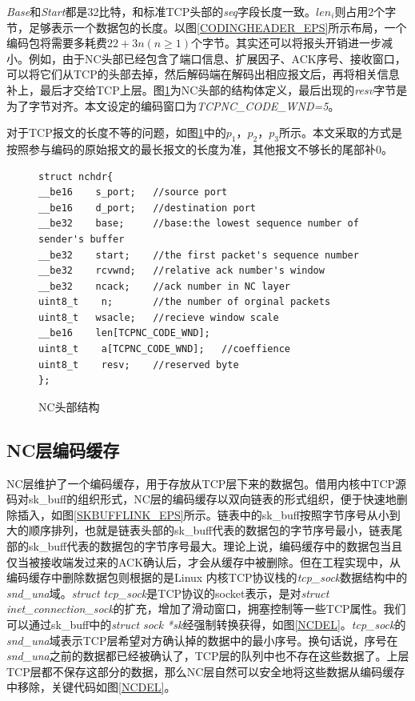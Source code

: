 \par
\emph{Base}和\emph{Start}都是32比特，和标准TCP头部的\emph{seq}字段长度一致。$len_{i}$则占用2个字节，足够表示一个数据包的长度。以图\ref{CODINGHEADER_EPS}所示布局，一个编码包将需要多耗费$22+3n\left(n \ge 1\right)$个字节。其实还可以将报头开销进一步减小。例如，由于NC头部已经包含了端口信息、扩展因子、ACK序号、接收窗口，可以将它们从TCP的头部去掉，然后解码端在解码出相应报文后，再将相关信息补上，最后才交给TCP上层。图\ref{NCHEAD}为NC头部的结构体定义，最后出现的\emph{resv}字节是为了字节对齐。本文设定的编码窗口为\emph{TCPNC\_CODE\_WND=5}。
\par
对于TCP报文的长度不等的问题，如图\ref{NCHEAD}中的$p_{1}$，$p_{2}$，$p_{3}$所示。本文采取的方式是按照参与编码的原始报文的最长报文的长度为准，其他报文不够长的尾部补0。
\begin{figure}
	\begin{lstlisting}[language={[ANSI]C}]
struct nchdr{
__be16    s_port;	//source port
__be16    d_port;	//destination port
__be32    base;		//base:the lowest sequence number of sender's buffer
__be32    start;	//the first packet's sequence number
__be32    rcvwnd;   //relative ack number's window
__be32    ncack;	//ack number in NC layer
uint8_t    n;		//the number of orginal packets
uint8_t   wsacle;	//recieve window scale
__be16    len[TCPNC_CODE_WND];
uint8_t    a[TCPNC_CODE_WND];	//coeffience
uint8_t    resv;	//reserved byte
};
	\end{lstlisting}
	\caption{NC头部结构}
	\label{NCHEAD}
\end{figure}
\subsection{NC层编码缓存}
NC层维护了一个编码缓存，用于存放从TCP层下来的数据包。借用内核中TCP源码对sk\_buff的组织形式，NC层的编码缓存以双向链表的形式组织，便于快速地删除插入，如图\ref{SKBUFFLINK_EPS}所示。链表中的sk\_buff按照字节序号从小到大的顺序排列，也就是链表头部的sk\_buff代表的数据包的字节序号最小，链表尾部的sk\_buff代表的数据包的字节序号最大。理论上说，编码缓存中的数据包当且仅当被接收端发过来的ACK确认后，才会从缓存中被删除。但在工程实现中，从编码缓存中删除数据包则根据的是Linux 内核TCP协议栈的\emph{tcp\_sock}数据结构中的\emph{snd\_una}域。\emph{struct tcp\_sock}是TCP协议的socket表示，是对\emph{struct inet\_connection\_sock}的扩充，增加了滑动窗口，拥塞控制等一些TCP属性。我们可以通过sk\_buff中的\emph{struct sock *sk}经强制转换获得，如图\ref{NCDEL}。\emph{tcp\_sock}的\emph{snd\_una}域表示TCP层希望对方确认掉的数据中的最小序号。换句话说，序号在\emph{snd\_una}之前的数据都已经被确认了，TCP层的队列中也不存在这些数据了。上层TCP层都不保存这部分的数据，那么NC层自然可以安全地将这些数据从编码缓存中移除，关键代码如图\ref{NCDEL}。

